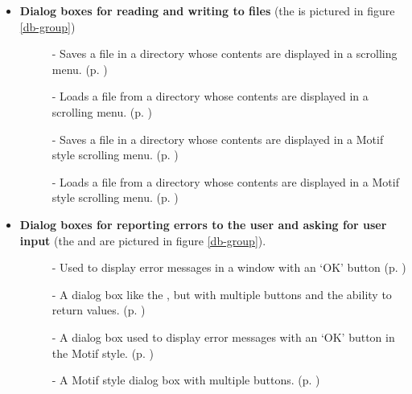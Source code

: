 \begin{group}
\begin{itemize}
\item {\bf Dialog boxes for reading and writing to files} (the  is
pictured in figure \ref{db-group})
\begin{description}
\item[]  - Saves a file in a directory whose contents are displayed
in a scrolling menu.  (p. \pageref{save-gadget})

\item[]  - Loads a file from a directory whose contents are displayed
in a scrolling menu.  (p. \pageref{load-gadget})

\item[]  - Saves a file in a directory whose contents are
displayed in a Motif style scrolling menu.  (p. \pageref{motif-save-gadget})

\item[]  - Loads a file from a directory whose contents are
displayed in a Motif style scrolling menu.  (p. \pageref{motif-load-gadget})
\end{description}
\end{itemize}
\end{group}

\begin{group}
\begin{itemize}
\item {\bf Dialog boxes for reporting errors to the user and asking for user
input}  (the  and  are pictured
in figure \ref{db-group}).
\begin{description}
\item[]  - Used to display error messages in a window with an
`OK' button (p. \pageref{error-gadget})

\item[]  - A dialog box like the , but with
multiple buttons and the ability to return values.
(p. \pageref{query-gadget})

\item[]  - A dialog box used to display error messages
with an `OK' button in the Motif style.
(p. \pageref{motif-error-gadget})

\item[]  - A Motif style dialog box with multiple buttons.
(p. \pageref{motif-query-gadget})

\end{description}
\end{itemize}
\end{group}


